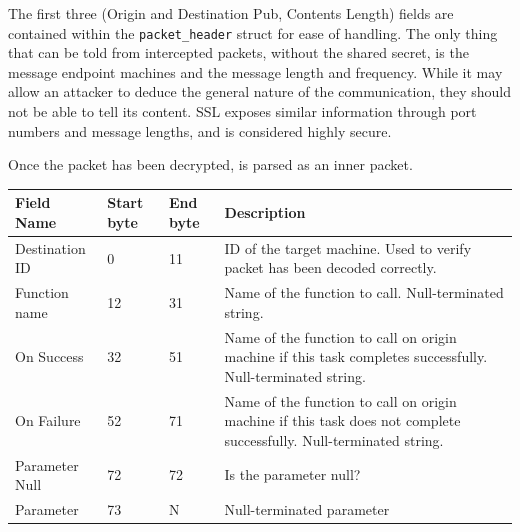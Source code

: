 \documentclass{article}
\begin{document}
The first three (Origin and Destination Pub, Contents Length) fields are contained within the \texttt{packet\_header} struct for ease of handling. The only thing that can be told from intercepted packets, without the shared secret, is the message endpoint machines and the message length and frequency. While it may allow an attacker to deduce the general nature of the communication, they should not be able to tell its content. SSL exposes similar information through port numbers and message lengths, and is considered highly secure.

Once the packet has been decrypted, is parsed as an inner packet.

\begin{table}[H]
\begin{tabular}{|p{25mm}|l|l|p{45mm}|}
\hline
\textbf{Field Name}	& \textbf{Start byte}		& \textbf{End byte}		& \textbf{Description} \\ \hline
Destination ID			& 0											& 11									& ID of the target machine. Used to verify packet has been decoded correctly.  \\ \hline
Function name				& 12										& 31									& Name of the function to call. Null-terminated string.  \\ \hline
On Success					& 32										& 51									& Name of the function to call on origin machine if this task completes successfully. Null-terminated string. \\ \hline
On Failure					& 52										& 71									& Name of the function to call on origin machine if this task does not complete successfully. Null-terminated string. \\ \hline
Parameter Null			& 72										& 72									& Is the parameter null? \\ \hline
Parameter						& 73										& N										& Null-terminated parameter \\ \hline
\end{tabular}
\end{table}
\end{document}

